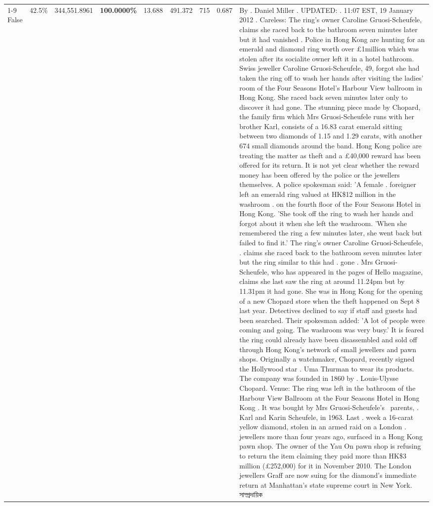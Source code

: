 \begin{table}[H]
\begin{tabular}{lllrlllll}
\cline{1-9}
False & 42.5\% & 344,551.8961 & \bfseries \color{red} 100.0000\% & 13.688 & 491.372 & 715 & 0.687 & By . Daniel Miller . UPDATED: . 11:07 EST, 19 January 2012 . Careless: The ring's owner Caroline Gruosi-Scheufele, claims she raced back to the bathroom seven minutes later but it had vanished . Police in Hong Kong are hunting for an emerald and diamond ring worth over £1million which was stolen after its socialite owner left it in a hotel bathroom. Swiss jeweller Caroline Gruosi-Scheufele, 49, forgot she had taken the ring off to wash her hands after visiting the ladies' room of the Four Seasons Hotel's Harbour View ballroom in Hong Kong. She raced back seven minutes later only to discover it had gone. The stunning piece made by Chopard, the family firm which Mrs Gruosi-Scheufele runs with her brother Karl, consists of a 16.83 carat emerald sitting between two diamonds of 1.15 and 1.29 carats, with another 674 small diamonds around the band. Hong Kong police are treating the matter as theft and a £40,000 reward has been offered for its return. It is not yet clear whether the reward money has been offered by the police or the jewellers themselves. A police spokesman said: 'A female . foreigner left an emerald ring valued at HK\$12 million in the washroom . on the fourth floor of the Four Seasons Hotel in Hong Kong. 'She took off the ring to wash her hands and forgot about it when she left the washroom. 'When she remembered the ring a few minutes later, she went back but failed to find it.' The ring's owner Caroline Gruosi-Scheufele, . claims she raced back to the bathroom seven minutes later but the ring similar to this had . gone . Mrs Gruosi-Scheufele, who has appeared in the pages of Hello magazine, claims she last saw the ring at around 11.24pm but by 11.31pm it had gone. She was in Hong Kong for the opening of a new Chopard store when the theft happened on Sept 8 last year. Detectives declined to say if staff and guests had been searched. Their spokesman added: 'A lot of people were coming and going. The washroom was very busy.' It is feared the ring could already have been disassembled and sold off through Hong Kong's network of small jewellers and pawn shops. Originally a watchmaker, Chopard, recently signed the Hollywood star . Uma Thurman to wear its products. The company was founded in 1860 by . Louis-Ulysse Chopard. Venue: The ring was left in the bathroom of the Harbour View Ballroom at the Four Seasons Hotel in Hong Kong . It was bought by Mrs Gruosi-Scheufele's  parents, . Karl and Karin Scheufele, in 1963. Last . week a 16-carat yellow diamond, stolen in an armed raid on a London . jewellers more than four years ago, surfaced in a Hong Kong pawn shop. The owner of the Yau On pawn shop is refusing to return the item claiming they paid more than HK\$3 million (£252,000) for it in November 2010. The London jewellers Graff are now suing for the diamond’s immediate return at Manhattan’s state supreme court in New York. সাম্প্রদায়িক \\

\end{tabular}
\end{table}
